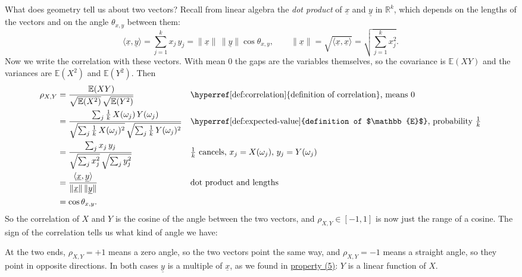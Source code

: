 \documentclass[a4paper,12pt,oneside]{report}
\begin{document}
What does geometry tell us about two vectors? Recall from linear algebra
the \emph{dot product} of $\underline{x}$ and $\underline{y}$ in
$\mathbb{R}^k$, which depends on the lengths of the vectors and on the
angle $\theta_{x,y}$ between them:
\[
\langle\underline{x},\underline{y}\rangle
=\sum_{j=1}^k x_j\,y_j
=\|\underline{x}\|\,\|\underline{y}\|\cos\theta_{x,y},
\qquad
\|\underline{x}\|=\sqrt{\langle\underline{x},\underline{x}\rangle}
=\sqrt{\textstyle\sum_{j=1}^k x_j^2} .
\]
Now we write the correlation with these vectors. With mean $0$ the gaps
are the variables themselves, so the covariance is $\mathbb{E}(XY)$ and the
variances are $\mathbb{E}(X^2)$ and $\mathbb{E}(Y^2)$. Then
\begin{align*}
\rho_{X,Y}
&=\frac{\mathbb{E}(XY)}{\sqrt{\mathbb{E}(X^2)}\,\sqrt{\mathbb{E}(Y^2)}}
&&\text{\hyperref[def:correlation]{definition of correlation}, means $0$}\\
&=\frac{\sum_{j}\frac1k\,X(\omega_j)\,Y(\omega_j)}
{\sqrt{\sum_{j}\frac1k\,X(\omega_j)^2}\,\sqrt{\sum_{j}\frac1k\,Y(\omega_j)^2}}
&&\text{\hyperref[def:expected-value]{definition of $\mathbb{E}$}, probability $\tfrac1k$}\\
&=\frac{\sum_{j}x_j\,y_j}{\sqrt{\sum_{j}x_j^2}\,\sqrt{\sum_{j}y_j^2}}
&&\text{$\tfrac1k$ cancels, $x_j=X(\omega_j)$, $y_j=Y(\omega_j)$}\\
&=\frac{\langle\underline{x},\underline{y}\rangle}{\|\underline{x}\|\,\|\underline{y}\|}
&&\text{dot product and lengths}\\
&=\cos\theta_{x,y} .
\end{align*}
So the correlation of $X$ and $Y$ is the cosine of the angle between the
two vectors, and $\rho_{X,Y}\in[-1,1]$ is now just the range of a cosine.
The sign of the correlation tells us what kind of angle we have:
\begin{center}
\end{center}
At the two ends, $\rho_{X,Y}=+1$ means a zero angle, so the two vectors
point the same way, and $\rho_{X,Y}=-1$ means a straight angle, so they
point in opposite directions. In both cases $\underline{y}$ is a multiple
of $\underline{x}$, as we found in \hyperref[prop:corr-properties]{property
(5)}: $Y$ is a linear function of $X$.
\end{document}
